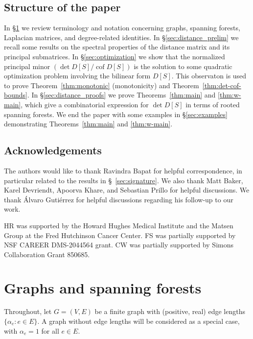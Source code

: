 \documentclass[12pt]{amsart}
\theoremstyle{definition}
\DeclareMathOperator{\cof}{cof}
\newcommand\farbod[1]{\footnote{[\textcolor{orange}{(Farbod)} \textcolor{blue}{#1}]}}
\begin{document}
\subsection*{Structure of the paper}

In \S\ref{sec:graphs-matrices} we review terminology and notation concerning graphs, spanning forests, Laplacian matrices, and degree-related identities.
In \S\ref{sec:distance_prelim} we recall some results on the spectral properties of the distance matrix and its principal submatrices.
In \S\ref{sec:optimization} we show that the normalized principal minor $(\det D[S] / \cof D[S])$ is the solution to some quadratic optimization problem involving the bilinear form $D[S]$.
This observaton is used to prove
Theorem~\ref{thm:monotonic} (monotonicity) and Theorem~\ref{thm:det-cof-bounds}.
In \S\ref{sec:distance_proofs} we prove Theorems~\ref{thm:main} and \ref{thm:w-main}, which give a combinatorial expression for $\det D[S]$ in terms of rooted spanning forests.
We end the paper with some examples in \S\ref{sec:examples} demonstrating Theorems~\ref{thm:main} and \ref{thm:w-main}.


\subsection*{Acknowledgements}
The authors would like to thank Ravindra Bapat for helpful correspondence,
in particular related to the results in \S~\ref{sec:signature}. 
We also thank Matt Baker, Karel Devriendt, Apoorva Khare, and Sebastian Prillo for helpful discussions.
We thank \'{A}lvaro Guti\'{e}rrez for helpful discussions regarding his follow-up to our work.

 HR was supported by the Howard Hughes Medical Institute and the Matsen Group at the Fred Hutchinson Cancer Center. 
 FS was partially supported by NSF CAREER DMS-2044564 grant.
 CW was partially supported by Simons Collaboration Grant 850685.


\renewcommand*{\thethm}{\arabic{section}.\arabic{thm}}

\section{Graphs and spanning forests}
\label{sec:graphs-matrices}

Throughout, let $G = (V, E)$ be a finite graph with (positive, real) edge lengths $\{ \alpha_e \colon e \in E\}$. 
A graph without edge lengths will be considered as a special case, with $\alpha_e=1$ for all $e \in E$.
\end{document}
